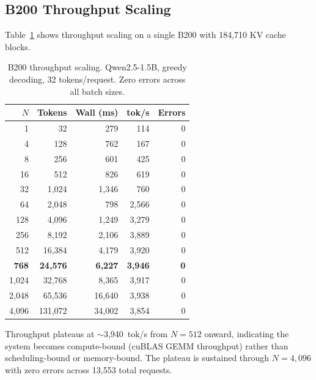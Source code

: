 \documentclass[11pt,a4paper]{article}
\newcommand{\thead}[1]{\textbf{\color{white}#1}}
\begin{document}
\subsection{B200 Throughput Scaling}

Table~\ref{tab:b200} shows throughput scaling on a single B200 with 184{,}710 KV
cache blocks.

\begin{table}[t]
  \centering
  \caption{B200 throughput scaling. Qwen2.5-1.5B, greedy decoding, 32 tokens/request. Zero errors across all batch sizes.}
  \label{tab:b200}
  \small
  \begin{tabular}{@{}rrrrr@{}}
    \toprule
    \rowcolor{HeaderBlue} \thead{$N$} & \thead{Tokens} & \thead{Wall (ms)} & \thead{tok/s} & \thead{Errors} \\
    \midrule
    1     & 32      & 279     & 114    & 0 \\
    \rowcolor{gray!8}
    4     & 128     & 762     & 167    & 0 \\
    8     & 256     & 601     & 425    & 0 \\
    \rowcolor{gray!8}
    16    & 512     & 826     & 619    & 0 \\
    32    & 1{,}024  & 1{,}346 & 760    & 0 \\
    \rowcolor{gray!8}
    64    & 2{,}048  & 798     & 2{,}566 & 0 \\
    128   & 4{,}096  & 1{,}249 & 3{,}279 & 0 \\
    \rowcolor{gray!8}
    256   & 8{,}192  & 2{,}106 & 3{,}889 & 0 \\
    512   & 16{,}384 & 4{,}179 & 3{,}920 & 0 \\
    \rowcolor{gray!8}
    \textbf{768} & \textbf{24{,}576} & \textbf{6{,}227} & \textbf{3{,}946} & \textbf{0} \\
    1{,}024 & 32{,}768 & 8{,}365 & 3{,}917 & 0 \\
    \rowcolor{gray!8}
    2{,}048 & 65{,}536 & 16{,}640 & 3{,}938 & 0 \\
    4{,}096 & 131{,}072 & 34{,}002 & 3{,}854 & 0 \\
    \bottomrule
  \end{tabular}
\end{table}

Throughput plateaus at $\sim$3{,}940~tok/s from $N\!=\!512$ onward, indicating
the system becomes compute-bound (cuBLAS GEMM throughput) rather than
scheduling-bound or memory-bound. The plateau is sustained through $N\!=\!4{,}096$
with zero errors across 13{,}553 total requests.
\end{document}
